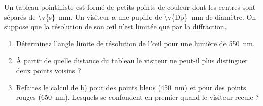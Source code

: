 Un tableau pointilliste est formé de petits points de couleur dont les centres sont séparés de \qty{\v{s}}{mm}. Un visiteur a une pupille de \qty{\v{Dp}}{mm} de diamètre. On suppose que la résolution de son œil n'est limitée que par la diffraction.

\begin{enumerate}[label=\alph*)]
    \item Déterminez l'angle limite de résolution de l'œil pour une lumière de \qty{550}{nm}.
    \item À partir de quelle distance du tableau le visiteur ne peut-il plus distinguer deux points voisins ?
    \item Refaites le calcul de b) pour des points bleus (\qty{450}{nm}) et pour des points rouges (\qty{650}{nm}). Lesquels se confondent en premier quand le visiteur recule ?
\end{enumerate}
